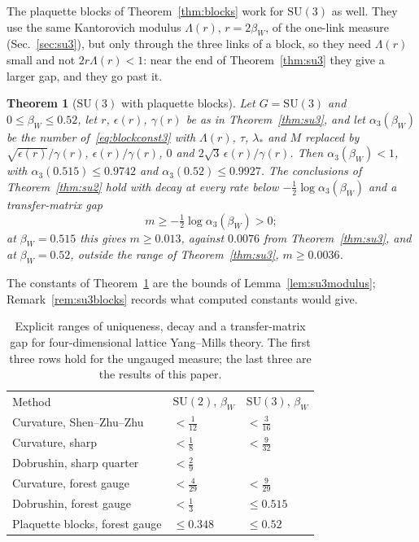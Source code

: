 \documentclass[aps,prd,twocolumn,superscriptaddress,nofootinbib,longbibliography,floatfix,amsmath,amssymb,10pt]{revtex4-2}
\newtheorem{theorem}{Theorem}
\theoremstyle{definition}
\theoremstyle{remark}
\newcommand{\SU}{\mathrm{SU}}
\begin{document}
The plaquette blocks of Theorem~\ref{thm:blocks} work for $\SU(3)$ as well.
They use the same Kantorovich modulus $\Lambda(r)$, $r=2\beta_W$, of the one-link measure (Sec.~\ref{sec:su3}), but only through the
three links of a block, so they need $\Lambda(r)$ small and not
$2r\Lambda(r)<1$: near the end of Theorem~\ref{thm:su3} they give a larger
gap, and they go past it.

\begin{theorem}[$\SU(3)$ with plaquette blocks]\label{thm:su3blocks}
Let $G=\SU(3)$ and $0\le\beta_W\le0.52$, let $r$, $\epsilon(r)$, $\gamma(r)$
be as in Theorem~\ref{thm:su3}, and let $\alpha_3(\beta_W)$ be the
number of~\eqref{eq:blockconst3} with $\Lambda(r)$, $\tau$, $\lambda_*$ and
$M$ replaced by $\sqrt{\epsilon(r)}/\gamma(r)$, $\epsilon(r)/\gamma(r)$, $0$
and $2\sqrt3\,\epsilon(r)/\gamma(r)$. Then $\alpha_3(\beta_W)<1$, with
$\alpha_3(0.515)\le0.9742$ and $\alpha_3(0.52)\le0.9927$. The conclusions of
Theorem~\ref{thm:su2} hold with decay at every rate below
$-\frac12\log\alpha_3(\beta_W)$ and a transfer-matrix gap
\[
m\ge-\tfrac12\log\alpha_3(\beta_W)>0 ;
\]
at $\beta_W=0.515$ this gives $m\ge0.013$, against $0.0076$ from
Theorem~\ref{thm:su3}, and at $\beta_W=0.52$, outside the range of
Theorem~\ref{thm:su3}, $m\ge0.0036$.
\end{theorem}

The constants of Theorem~\ref{thm:su3blocks} are the bounds of
Lemma~\ref{lem:su3modulus}; Remark~\ref{rem:su3blocks} records what
computed constants would give.

\begin{table}[t]
\caption{Explicit ranges of uniqueness, decay and a transfer-matrix gap for
four-dimensional lattice Yang--Mills theory. The first three rows hold for
the ungauged measure; the last three are the results of this paper.}
\label{tab:ranges}
\begin{ruledtabular}
\begin{tabular}{lll}
Method&$\SU(2)$, $\beta_W$&$\SU(3)$, $\beta_W$\\
\colrule
Curvature, Shen--Zhu--Zhu~\cite{SZZ23}&$<\frac1{12}$&$<\frac3{16}$\\
Curvature, sharp~\cite{BB26a}&$<\frac18$&$<\frac9{32}$\\
Dobrushin, sharp quarter~\cite{BB26a}&$<\frac29$&\\
Curvature, forest gauge&$<\frac4{29}$&$<\frac9{29}$\\
Dobrushin, forest gauge&$<\frac13$&$\le0.515$\\
Plaquette blocks, forest gauge&$\le0.348$&$\le0.52$\\
\end{tabular}
\end{ruledtabular}
\end{table}
\end{document}
